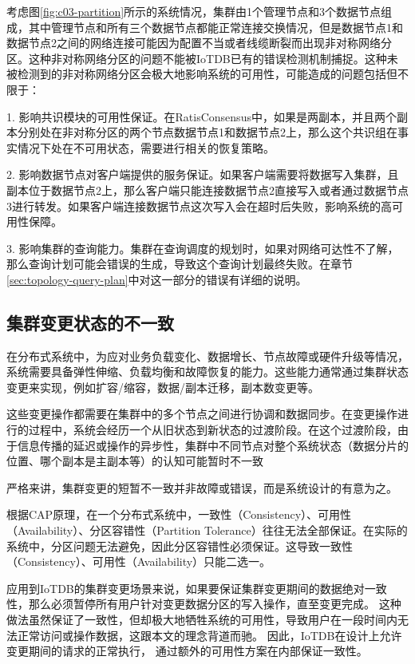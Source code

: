 考虑图\ref{fig:c03-partition}所示的系统情况，集群由1个管理节点和3个数据节点组成，其中管理节点和所有三个数据节点都能正常连接交换情况，但是数据节点1和数据节点2之间的网络连接可能因为配置不当或者线缆断裂而出现非对称网络分区。这种非对称网络分区的问题不能被IoTDB已有的错误检测机制捕捉。这种未被检测到的非对称网络分区会极大地影响系统的可用性，可能造成的问题包括但不限于：

1. 影响共识模块的可用性保证。在RatisConsensus中，如果是两副本，并且两个副本分别处在非对称分区的两个节点数据节点1和数据节点2上，那么这个共识组在事实情况下处在不可用状态，需要进行相关的恢复策略。

2. 影响数据节点对客户端提供的服务保证。如果客户端需要将数据写入集群，且副本位于数据节点2上，那么客户端只能连接数据节点2直接写入或者通过数据节点3进行转发。如果客户端连接数据节点这次写入会在超时后失败，影响系统的高可用性保障。

3. 影响集群的查询能力。集群在查询调度的规划时，如果对网络可达性不了解，那么查询计划可能会错误的生成，导致这个查询计划最终失败。在章节\ref{sec:topology-query-plan}中对这一部分的错误有详细的说明。

\subsection{集群变更状态的不一致}

在分布式系统中，为应对业务负载变化、数据增长、节点故障或硬件升级等情况，系统需要具备弹性伸缩、负载均衡和故障恢复的能力。这些能力通常通过集群状态变更来实现，例如扩容/缩容，数据/副本迁移，副本数变更等。

这些变更操作都需要在集群中的多个节点之间进行协调和数据同步。在变更操作进行的过程中，系统会经历一个从旧状态到新状态的过渡阶段。在这个过渡阶段，由于信息传播的延迟或操作的异步性，集群中不同节点对整个系统状态（数据分片的位置、哪个副本是主副本等）的认知可能暂时不一致

严格来讲，集群变更的短暂不一致并非故障或错误，而是系统设计的有意为之。

根据CAP原理\cite{fox1999harvest}，在一个分布式系统中，一致性（Consistency）、可用性（Availability）、分区容错性（Partition Tolerance）往往无法全部保证。在实际的系统中，分区问题无法避免，因此分区容错性必须保证。这导致一致性（Consistency）、可用性（Availability）只能二选一。

应用到IoTDB的集群变更场景来说，如果要保证集群变更期间的数据绝对一致性，那么必须暂停所有用户针对变更数据分区的写入操作，直至变更完成。
这种做法虽然保证了一致性，但却极大地牺牲系统的可用性，导致用户在一段时间内无法正常访问或操作数据，这跟本文的理念背道而驰。
因此，IoTDB在设计上允许变更期间的请求的正常执行，
通过额外的可用性方案在内部保证一致性。


